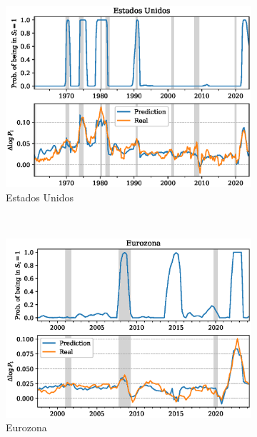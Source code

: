 \documentclass[titlepage, 12pt]{article}
\begin{document}
\begin{figure}
    \centering
    \begin{subfigure}[b]{0.49\textwidth}
        \includegraphics[width=\textwidth]{plots/us-markov-cpi.eps}
        \caption{Estados Unidos}
    \end{subfigure}
    ~
    \begin{subfigure}[b]{0.49\textwidth}
        \includegraphics[width=\textwidth]{plots/eu-markov-cpi.eps}
        \caption{Eurozona}
    \end{subfigure}
    ~
    \begin{subfigure}[b]{0.49\textwidth}

\end{subfigure}
\end{figure}
\end{document}
